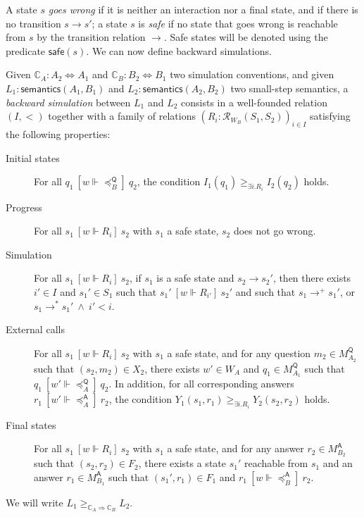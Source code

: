 \documentclass[acmsmall,timestamp,review,anonymous]{acmart}
\newcommand{\kw}[1]{\ensuremath{ \mathsf{#1} }}
\newcommand{\ifr}[1]{\ [{#1}]\ }
\begin{document}
A state $s$ \emph{goes wrong}
if it is neither an interaction nor a final state,
and if there is no transition $s \rightarrow s'$;
a state $s$ is \emph{safe}
if no state that goes wrong is reachable from $s$
by the transition relation $\rightarrow$.
Safe states will be denoted using the predicate $\kw{safe}(s)$.
We can now define backward simulations.

\begin{definition}
Given
$\mathbb{C}_A : A_2 \Leftrightarrow A_1$ and
$\mathbb{C}_B : B_2 \Leftrightarrow B_1$
two simulation conventions,
and given
$L_1 : \kw{semantics}(A_1, B_1)$ and
$L_2 : \kw{semantics}(A_2, B_2)$
two small-step semantics,
a \emph{backward simulation} between $L_1$ and $L_2$
consists in a
well-founded relation $(I, <)$
together with a family of relations
$(R_i : \mathcal{R}_{W_B}(S_1, S_2))_{i \in I}$
satisfying the following properties:
\begin{description}
\item[Initial states]
  For all
  $q_1 \ifr{w \Vdash {\preceq}_B^\kw{Q}} q_2$,
  the condition $I_1(q_1) \ge_{\exists i . R_i} I_2(q_2)$ holds.
\item[Progress]
  For all $s_1 \ifr{w \Vdash R_i} s_2$
  with $s_1$ a safe state,
  $s_2$ does not go wrong.
\item[Simulation]
  For all $s_1 \ifr{w \Vdash R_i} s_2$,
  if $s_1$ is a safe state and $s_2 \rightarrow s_2'$,
  then there exists $i' \in I$ and $s_1' \in S_1$
  such that $s_1' \ifr{w \Vdash R_{i'}} s_2'$ and
  such that 
    $s_1 \rightarrow^+ s_1'$, or
    $s_1 \rightarrow^* s_1' \:\wedge\: i' < i$.
\item[External calls]
  For all $s_1 \ifr{w \Vdash R_i} s_2$
  with $s_1$ a safe state, and
  for any question $m_2 \in M_{A_2}^\kw{Q}$
  such that $(s_2, m_2) \in X_2$,
  there exists $w' \in W_A$ and $q_1 \in M_{A_1}^\kw{Q}$
  such that $q_1 \ifr{w' \Vdash {\preceq}_A^\kw{Q}} q_2$.
  In addition, for all corresponding answers
  $r_1 \ifr{w' \Vdash {\preceq}_A^\kw{A}} r_2$,
  the condition $Y_1(s_1, r_1) \ge_{\exists i . R_i} Y_2(s_2, r_2)$ holds.
\item[Final states]
  For all $s_1 \ifr{w \Vdash R_i} s_2$
  with $s_1$ a safe state, and
  for any answer $r_2 \in M_{B_2}^\kw{A}$
  such that $(s_2, r_2) \in F_2$,
  there exists a state $s_1'$ reachable from $s_1$ and
  an answer $r_1 \in M_{B_1}^\kw{A}$ such that
  $(s_1', r_1) \in F_1$ and $r_1 \ifr{w \Vdash {\preceq}_B^\kw{A}} r_2$.
\end{description}
We will write $L_1 \ge_{\mathbb{C}_A \Rightarrow \mathbb{C}_B} L_2$.
\end{definition}
\end{document}
